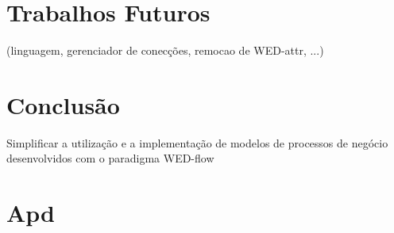 \documentclass[conference]{IEEEtran}
\begin{document}

\section{Trabalhos Futuros}
(linguagem, gerenciador de conecções, remocao de WED-attr, ...)

\section{Conclusão}
Simplificar a utilização e a implementação de modelos de processos de negócio desenvolvidos com o paradigma WED-flow






%


\appendices
\section{Apd }
\blindtext
\end{document}
